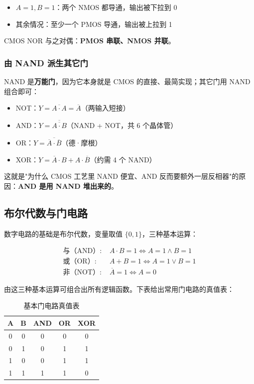 \begin{itemize}
    \item $A=1,B=1$：两个 NMOS 都导通，输出被下拉到 0
    \item 其余情况：至少一个 PMOS 导通，输出被上拉到 1
\end{itemize}

CMOS NOR 与之对偶：\textbf{PMOS 串联、NMOS 并联}。

\subsubsection{由 NAND 派生其它门}

NAND 是\textbf{万能门}，因为它本身就是 CMOS 的直接、最简实现；其它门用 NAND 组合即可：

\begin{itemize}
    \item NOT：$Y = \overline{A \cdot A} = \overline{A}$（两输入短接）
    \item AND：$Y = \overline{\overline{A \cdot B}}$（NAND + NOT，共 6 个晶体管）
    \item OR：$Y = \overline{\overline{A} \cdot \overline{B}}$（德·摩根）
    \item XOR：$Y = \overline{A} \cdot B + A \cdot \overline{B}$（约需 4 个 NAND）
\end{itemize}

这就是"为什么 CMOS 工艺里 NAND 便宜、AND 反而要额外一层反相器"的原因：\textbf{AND 是用 NAND 堆出来的}。

\subsection{布尔代数与门电路}

数字电路的基础是布尔代数，变量取值 $\{0, 1\}$，三种基本运算：

\begin{equation}
\begin{aligned}
\text{与（AND）: } & A \cdot B = 1 \iff A=1 \land B=1 \\
\text{或（OR）: } & A + B = 1 \iff A=1 \lor B=1 \\
\text{非（NOT）: } & \overline{A} = 1 \iff A=0
\end{aligned}
\end{equation}

由这三种基本运算可组合出所有逻辑函数。下表给出常用门电路的真值表：

\begin{table}[H]
\centering
\caption{基本门电路真值表}
\label{tab:gates}
\begin{tabulary}{\textwidth}{CCCCC}
\toprule
\textbf{A} & \textbf{B} & \textbf{AND} & \textbf{OR} & \textbf{XOR} \\
 & 0 & 0 & 0 & 0 \\
0 & 1 & 0 & 1 & 1 \\
1 & 0 & 0 & 1 & 1 \\
1 & 1 & 1 & 1 & 0 \\
\bottomrule
\end{tabulary}
\end{table}

